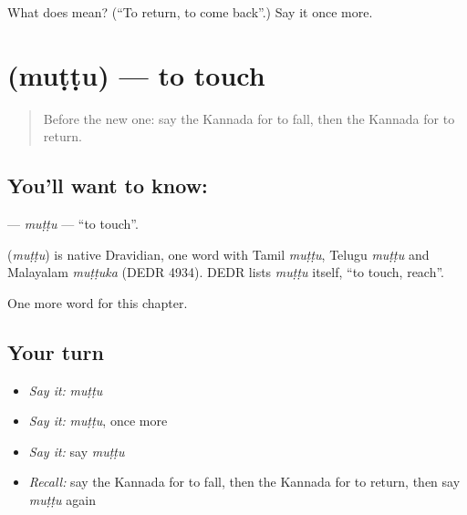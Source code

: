 \begin{tcolorbox}[breakable,colback=teal!4,colframe=teal!35!black,title={Before you move on}]
What does  mean? (\textquotedblleft{}To return, to come back\textquotedblright{}.) Say it once more.
\end{tcolorbox}
\section[\texorpdfstring{\kn{ಮುಟ್ಟು} (muṭṭu)}{ಮುಟ್ಟು (muṭṭu)}]{ (muṭṭu) — to touch}

\label{lesson:KA-C235-muttu}



\begin{quote}
Before the new one: say the Kannada for to fall, then the Kannada for to return.
\end{quote}

\subsection*{You'll want to know: }
\textbf{} — \emph{muṭṭu} — \textquotedblleft{}to touch\textquotedblright{}.

\begin{cousinweb}
\textbf{} (\emph{muṭṭu}) is native Dravidian, one word with Tamil \emph{muṭṭu}, Telugu \emph{muṭṭu} and Malayalam \emph{muṭṭuka} (DEDR 4934). DEDR lists \emph{muṭṭu} itself, \textquotedblleft{}to touch, reach\textquotedblright{}.
\end{cousinweb}

\begin{grammarlens}[title={What you've built}]
One more word for this chapter.
\end{grammarlens}

\subsection*{Your turn}
\begin{itemize}
\raggedright
  \item \emph{Say it:} \emph{muṭṭu}
  \item \emph{Say it:} \emph{muṭṭu}, once more
  \item \emph{Say it:} say \emph{muṭṭu}
  \item \emph{Recall:} say the Kannada for to fall, then the Kannada for to return, then say \emph{muṭṭu} again
\end{itemize}

